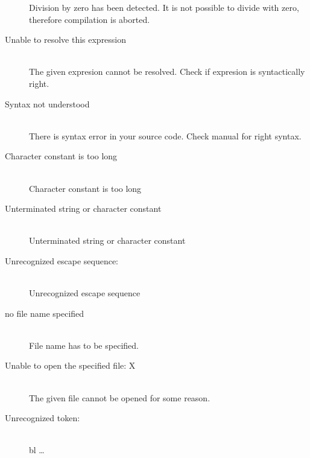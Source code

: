 \begin{description}
                    Division by zero has been detected. It is not possible to divide with zero, therefore compilation is aborted.
                    \item[Unable to resolve this expression ] \hfill \\
                    The given expresion cannot be resolved. Check if expresion is syntactically right.
                    \item[Syntax not understood ] \hfill \\
                    There is syntax error in your source code. Check manual for right syntax.
                    \item[Character constant is too long ] \hfill \\
                    Character constant is too long
                    \item[Unterminated string or character constant ] \hfill \\
                    Unterminated string or character constant
                    \item[Unrecognized escape sequence: ] \hfill \\
                    Unrecognized escape sequence
                    \item[no file name specified ] \hfill \\                                                                            %
                    File name has to be specified.
                    \item[Unable to open the specified file: X] \hfill \\
                    The given file cannot be opened for some reason.
                    \item[Unrecognized token:  ] \hfill \\                    %
                    bl
                    \ldots
                    \end{description}

